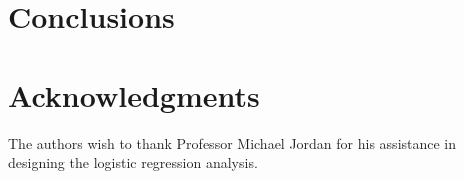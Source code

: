\section{Conclusions}
\label{sec:conclusions}


\section{Acknowledgments}

The authors wish to thank Professor Michael Jordan for his assistance
in designing the logistic regression analysis.

